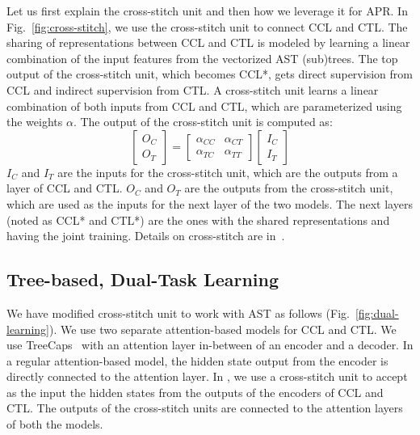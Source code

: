 Let us first explain the cross-stitch unit and then how we leverage it
for APR. In Fig.~\ref{fig:cross-stitch},
we use the cross-stitch unit to connect CCL and CTL. The sharing of
representations between CCL and CTL is modeled by learning a linear
combination of the input features from the vectorized AST
(sub)trees. The top output of the cross-stitch unit, which becomes
CCL*, gets direct supervision from CCL and indirect supervision from
CTL.
A cross-stitch unit learns a linear combination of both inputs from
CCL and CTL, which are parameterized using the weights $\alpha$. The
output of the cross-stitch unit is computed as:
\begin{equation}\label{eq:cross-stitch}
	\begin{bmatrix}
		O_C\\
		O_T
	\end{bmatrix}
	=
	\begin{bmatrix}
		\alpha_{CC} &  \alpha_{CT} \\
		\alpha_{TC} &  \alpha_{TT}
	\end{bmatrix}
	\begin{bmatrix}
		I_C\\
		I_T
	\end{bmatrix}
\end{equation}
$I_C$ and $I_T$ are the inputs for the cross-stitch unit, which are
the outputs from a layer of CCL and CTL. $O_C$ and $O_T$ are the
outputs from the cross-stitch unit, which are used as the inputs
for the next layer of the two models.
The next layers (noted as CCL* and CTL*) are the ones with the shared
representations and having the joint training. Details on
cross-stitch are in~\cite{misra2016cross}.

\subsection{Tree-based, Dual-Task Learning}



We have modified cross-stitch unit to work with AST as follows
(Fig.~\ref{fig:dual-learning}). We use two separate attention-based
 models for CCL and CTL. We use
TreeCaps~\cite{bui2021treecaps} with an attention layer in-between of
an encoder and a decoder. In a regular attention-based 
model, the hidden state output from the encoder is directly connected
to the attention layer. In {\tool}, we use a cross-stitch unit to
accept as the input the hidden states from the outputs of the encoders
of CCL and CTL. The outputs of the cross-stitch units are connected to
the attention layers of both the models.

